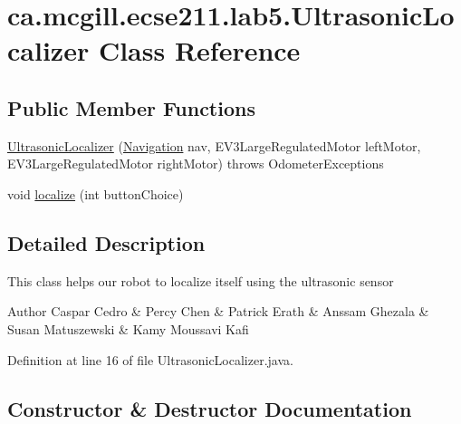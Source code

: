 \hypertarget{classca_1_1mcgill_1_1ecse211_1_1lab5_1_1_ultrasonic_localizer}{}\section{ca.\+mcgill.\+ecse211.\+lab5.\+Ultrasonic\+Localizer Class Reference}
\label{classca_1_1mcgill_1_1ecse211_1_1lab5_1_1_ultrasonic_localizer}
\subsection*{Public Member Functions}
\begin{DoxyCompactItemize}
\item 
\hyperlink{classca_1_1mcgill_1_1ecse211_1_1lab5_1_1_ultrasonic_localizer_a47c08f2d2ec2ba664867231ca62020da}{Ultrasonic\+Localizer} (\hyperlink{classca_1_1mcgill_1_1ecse211_1_1lab5_1_1_navigation}{Navigation} nav, E\+V3\+Large\+Regulated\+Motor left\+Motor, E\+V3\+Large\+Regulated\+Motor right\+Motor)  throws Odometer\+Exceptions 
\item 
void \hyperlink{classca_1_1mcgill_1_1ecse211_1_1lab5_1_1_ultrasonic_localizer_a7fd82ab7240a07ae6947313c0769d4bc}{localize} (int button\+Choice)
\end{DoxyCompactItemize}


\subsection{Detailed Description}
This class helps our robot to localize itself using the ultrasonic sensor

\begin{DoxyAuthor}{Author}
Caspar Cedro \& Percy Chen \& Patrick Erath \& Anssam Ghezala \& Susan Matuszewski \& Kamy Moussavi Kafi 
\end{DoxyAuthor}


Definition at line 16 of file Ultrasonic\+Localizer.\+java.



\subsection{Constructor \& Destructor Documentation}
\mbox{\label{classca_1_1mcgill_1_1ecse211_1_1lab5_1_1_ultrasonic_localizer_a47c08f2d2ec2ba664867231ca62020da}} 
